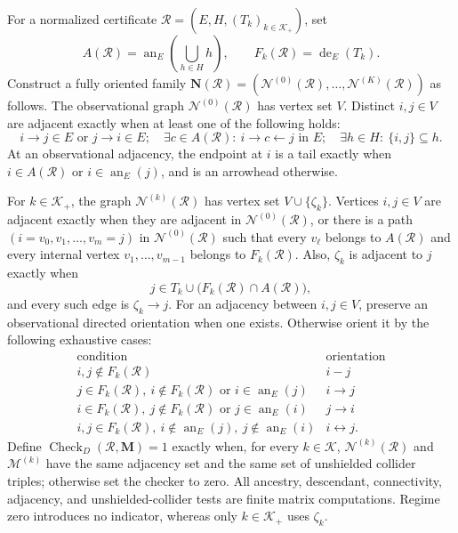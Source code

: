 For a normalized certificate \(\mathcal R=(E,H,(T_k)_{k\in\mathcal K_+})\), set
\[
A(\mathcal R)=\operatorname{an}_E\!\left(\bigcup_{h\in H}h\right),
\qquad
F_k(\mathcal R)=\operatorname{de}_E(T_k).
\]
Construct a fully oriented family \(\mathbf N(\mathcal R)=(\mathcal N^{(0)}(\mathcal R),\ldots,\mathcal N^{(K)}(\mathcal R))\) as follows.  The observational graph \(\mathcal N^{(0)}(\mathcal R)\) has vertex set \(V\).  Distinct \(i,j\in V\) are adjacent exactly when at least one of the following holds:
\[
i\to j\in E\text{ or }j\to i\in E;
\quad
\exists c\in A(\mathcal R):\ i\to c\leftarrow j\text{ in }E;
\quad
\exists h\in H:\ \{i,j\}\subseteq h.
\]
At an observational adjacency, the endpoint at \(i\) is a tail exactly when \(i\in A(\mathcal R)\) or \(i\in\operatorname{an}_E(j)\), and is an arrowhead otherwise.

For \(k\in\mathcal K_+\), the graph \(\mathcal N^{(k)}(\mathcal R)\) has vertex set \(V\cup\{\zeta_k\}\).  Vertices \(i,j\in V\) are adjacent exactly when they are adjacent in \(\mathcal N^{(0)}(\mathcal R)\), or there is a path \((i=v_0,v_1,\ldots,v_m=j)\) in \(\mathcal N^{(0)}(\mathcal R)\) such that every \(v_\ell\) belongs to \(A(\mathcal R)\) and every internal vertex \(v_1,\ldots,v_{m-1}\) belongs to \(F_k(\mathcal R)\).  Also, \(\zeta_k\) is adjacent to \(j\) exactly when
\[
j\in T_k\cup\bigl(F_k(\mathcal R)\cap A(\mathcal R)\bigr),
\]
and every such edge is \(\zeta_k\to j\).  For an adjacency between \(i,j\in V\), preserve an observational directed orientation when one exists.  Otherwise orient it by the following exhaustive cases:
\[
\begin{array}{c|c}
\text{condition}&\text{orientation}\\ \hline
i,j\notin F_k(\mathcal R)&i\mathbin{-}j\\
j\in F_k(\mathcal R),\ i\notin F_k(\mathcal R)\text{ or }i\in\operatorname{an}_E(j)&i\to j\\
i\in F_k(\mathcal R),\ j\notin F_k(\mathcal R)\text{ or }j\in\operatorname{an}_E(i)&j\to i\\
i,j\in F_k(\mathcal R),\ i\notin\operatorname{an}_E(j),\ j\notin\operatorname{an}_E(i)&i\leftrightarrow j.
\end{array}
\]
Define \(\operatorname{Check}_{D}(\mathcal R,\mathbf M)=1\) exactly when, for every \(k\in\mathcal K\), \(\mathcal N^{(k)}(\mathcal R)\) and \(\mathcal M^{(k)}\) have the same adjacency set and the same set of unshielded collider triples; otherwise set the checker to zero.  All ancestry, descendant, connectivity, adjacency, and unshielded-collider tests are finite matrix computations.  Regime zero introduces no indicator, whereas only \(k\in\mathcal K_+\) uses \(\zeta_k\).